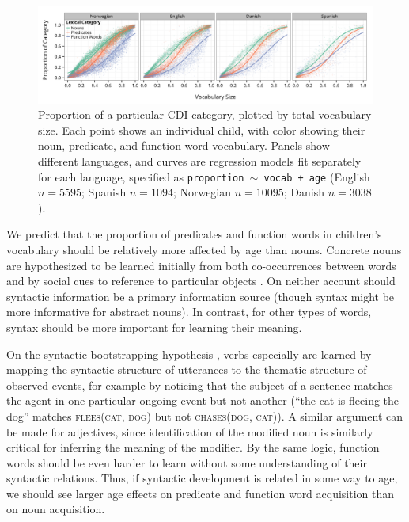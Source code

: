 \documentclass[10pt,letterpaper]{article}
\begin{document}
\begin{figure}
\begin{center}
\includegraphics[width=\linewidth]{plots/vocab_data_plot-1.png}
\end{center}
\caption{\label{fig:vocab_comp} Proportion of a particular CDI category, plotted by total vocabulary size. Each point shows an individual child, with color showing their noun, predicate, and function word vocabulary. Panels show different languages, and curves are regression models fit separately for each language, specified as \small{\tt{proportion $\sim$ vocab + age}} (English $n=5595$; Spanish $n=1094$; Norwegian $n=10095$; Danish $n=3038$).}
\end{figure}

We predict that the proportion of predicates and function words in children's vocabulary should be relatively more affected by age than nouns. Concrete nouns are hypothesized to be learned initially from both co-occurrences between words \cite{yu2007b} and by social cues to reference to particular objects \cite{bloom2002}. On neither account should syntactic information be a primary information source (though syntax might be more informative for abstract nouns). In contrast, for other types of words, syntax should be more important for learning their meaning.

On the syntactic bootstrapping hypothesis \cite{gleitman1990,fisher2010}, verbs especially are learned by mapping the syntactic structure of utterances to the thematic structure of observed events, for example by noticing that the subject of a sentence matches the agent in one particular ongoing event but not another (``the cat is fleeing the dog'' matches \textsc{flees(cat, dog)} but not \textsc{chases(dog, cat)}). A similar argument can be made for adjectives, since identification of the modified noun is similarly critical for inferring the meaning of the modifier. By the same logic, function words should be even harder to learn without some understanding of their syntactic relations. Thus, if syntactic development is related in some way to age, we should see larger age effects on predicate and function word acquisition than on noun acquisition. 
\end{document}
